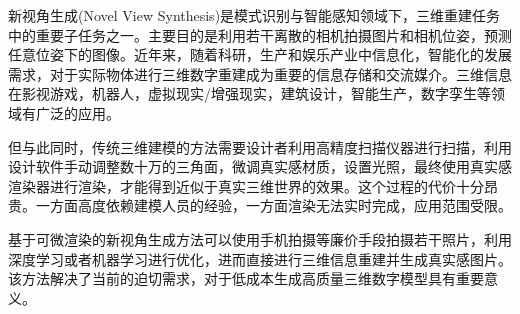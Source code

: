 
新视角生成(Novel View Synthesis)是模式识别与智能感知领域下，三维重建任务中的重要子任务之一。主要目的是利用若干离散的相机拍摄图片和相机位姿，预测任意位姿下的图像。近年来，随着科研，生产和娱乐产业中信息化，智能化的发展需求，对于实际物体进行三维数字重建成为重要的信息存储和交流媒介。三维信息在影视游戏，机器人，虚拟现实/增强现实，建筑设计，智能生产，数字孪生等领域有广泛的应用。

但与此同时，传统三维建模的方法需要设计者利用高精度扫描仪器进行扫描，利用设计软件手动调整数十万的三角面，微调真实感材质，设置光照，最终使用真实感渲染器进行渲染，才能得到近似于真实三维世界的效果。这个过程的代价十分昂贵。一方面高度依赖建模人员的经验，一方面渲染无法实时完成，应用范围受限。

基于可微渲染的新视角生成方法可以使用手机拍摄等廉价手段拍摄若干照片，利用深度学习或者机器学习进行优化，进而直接进行三维信息重建并生成真实感图片。该方法解决了当前的迫切需求，对于低成本生成高质量三维数字模型具有重要意义。
